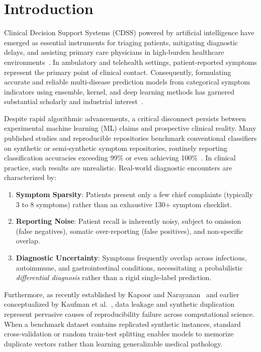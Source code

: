 \chapter{Introduction}
\label{chap:intro}

Clinical Decision Support Systems (CDSS) powered by artificial intelligence have emerged as essential instruments for triaging patients, mitigating diagnostic delays, and assisting primary care physicians in high-burden healthcare environments~\cite{shortliffe2018clinical, topol2019high, semigran2015evaluation, elias2021diagnostic}. In ambulatory and telehealth settings, patient-reported symptoms represent the primary point of clinical contact. Consequently, formulating accurate and reliable multi-disease prediction models from categorical symptom indicators using ensemble, kernel, and deep learning methods has garnered substantial scholarly and industrial interest~\cite{chen2016xgboost, breiman2001random, cortes1995support, shickel2017deep}.

Despite rapid algorithmic advancements, a critical disconnect persists between experimental machine learning (ML) claims and prospective clinical reality. Many published studies and reproducible repositories benchmark conventional classifiers on synthetic or semi-synthetic symptom repositories, routinely reporting classification accuracies exceeding 99\% or even achieving 100\%~\cite{kaushil2020kaggle}. In clinical practice, such results are unrealistic. Real-world diagnostic encounters are characterized by:
\begin{enumerate}
    \item \textbf{Symptom Sparsity}: Patients present only a few chief complaints (typically 3 to 8 symptoms) rather than an exhaustive 130+ symptom checklist.
    \item \textbf{Reporting Noise}: Patient recall is inherently noisy, subject to omission (false negatives), somatic over-reporting (false positives), and non-specific overlap.
    \item \textbf{Diagnostic Uncertainty}: Symptoms frequently overlap across infectious, autoimmune, and gastrointestinal conditions, necessitating a probabilistic \emph{differential diagnosis} rather than a rigid single-label prediction.
\end{enumerate}

Furthermore, as recently established by Kapoor and Narayanan~\cite{kapoor2023leakage} and earlier conceptualized by Kaufman et al.~\cite{kaufman2012leakage}, data leakage and synthetic duplication represent pervasive causes of reproducibility failure across computational science. When a benchmark dataset contains replicated synthetic instances, standard cross-validation or random train-test splitting enables models to memorize duplicate vectors rather than learning generalizable medical pathology.


